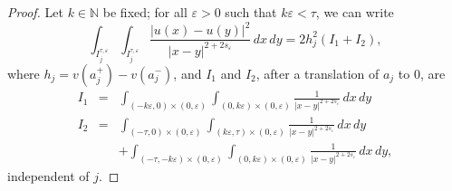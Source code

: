 \documentclass[11pt]{article}
\def\e{\varepsilon}
\begin{document}
\begin{proof}
Let $k\in\mathbb N$ be fixed; for all $\e>0$ such that $k\e<\tau$, 
we can write 
\begin{equation*}
\int_{I_j^{\tau,\e}}\int_{I_j^{\tau,\e}}\frac{|u(x)-u(y)|^2}{|x-y|^{2+2s_\e}}  \, dx\, dy= 
2h_j^2(I_1+I_2),  
\end{equation*}
where $h_j=v(a_j^+)-v(a_{j}^-)$, and $I_1$ and $I_2$, after a translation of $a_j$ to $0$, are 
\begin{eqnarray*}
I_1&=&\int_{(-k\e,0)\times (0,\e)}\int_{(0,k\e)\times (0,\e)}\frac{1}{|x-y|^{2+2s_\e}}  \, dx\, dy\\
I_2&=&\int_{(-\tau,0)\times (0,\e)}\int_{(k\e,\tau)\times (0,\e)}\frac{1}{|x-y|^{2+2s_\e}}  \, dx\, dy\\ 
&&+\int_{(-\tau,-k\e)\times (0,\e)}\int_{(0,k\e)\times (0,\e)}\frac{1}{|x-y|^{2+2s_\e}}  \, dx\, dy, 
\end{eqnarray*} 
independent of $j$. 



\end{proof}
\end{document}
